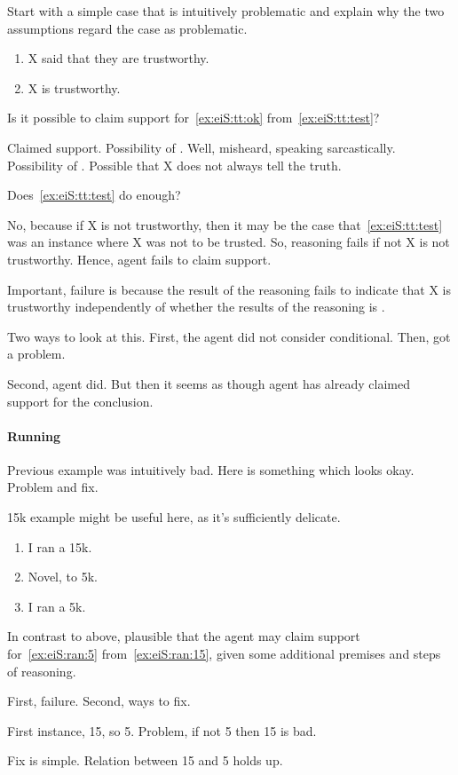 \begin{note}
  Start with a simple case that is intuitively problematic and explain why the two assumptions regard the case as problematic.

  \begin{enumerate}[label=\arabic*., ref=(\arabic*)]
  \item\label{ex:eiS:tt:test} X said that they are trustworthy.
  \item\label{ex:eiS:tt:ok} X is trustworthy.
  \end{enumerate}
  Is it possible to claim support for~\ref{ex:eiS:tt:ok} from~\ref{ex:eiS:tt:test}?

  Claimed support.
  Possibility of \mistaken{}.
  Well, misheard, speaking sarcastically.
  Possibility of \misled{}.
  Possible that X does not always tell the truth.

  Does~\ref{ex:eiS:tt:test} do enough?

  No, because if X is not trustworthy, then it may be the case that~\ref{ex:eiS:tt:test} was an instance where X was not to be trusted.
  So, reasoning fails if not X is not trustworthy.
  Hence, agent fails to claim support.

  Important, failure is because the result of the reasoning fails to indicate that X is trustworthy independently of whether the results of the reasoning is \mom{}.


  Two ways to look at this.
  First, the agent did not consider conditional.
  Then, got a problem.

  Second, agent did.
  But then it seems as though agent has already claimed support for the conclusion.
\end{note}

\paragraph{Running}

\begin{note}
  Previous example was intuitively bad.
  Here is something which looks okay.
  Problem and fix.
\end{note}

\begin{note}
  15k example might be useful here, as it's sufficiently delicate.

  \begin{enumerate}[label=\arabic*., ref=(\arabic*)]
  \item\label{ex:eiS:ran:15} I ran a 15k.
  \item Novel, to 5k.
  \item\label{ex:eiS:ran:5} I ran a 5k.
  \end{enumerate}

  In contrast to above, plausible that the agent may claim support for~\ref{ex:eiS:ran:5} from~\ref{ex:eiS:ran:15}, given some additional premises and steps of reasoning.

  First, failure.
  Second, ways to fix.

  First instance, 15, so 5.
  Problem, if not 5 then 15 is bad.

  Fix is simple.
  Relation between 15 and 5 holds up.
\end{note}

